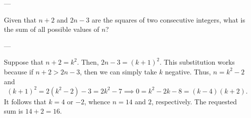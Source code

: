 
---

Given that $n+2$ and $2n-3$ are the squares of two consecutive integers, what is the sum of all possible values of $n$?

---

Suppose that $n+2=k^2$. Then, $2n-3=(k+1)^2$. This substitution works because if $n+2>2n-3$, then we can simply take $k$ negative. Thus, $n=k^2-2$ and \[(k+1)^2=2(k^2-2)-3=2k^2-7\implies 0=k^2-2k-8=(k-4)(k+2).\]
It follows that $k=4$ or $-2$, whence $n=14$ and $2$, respectively. The requested sum is $14+2=16$.

